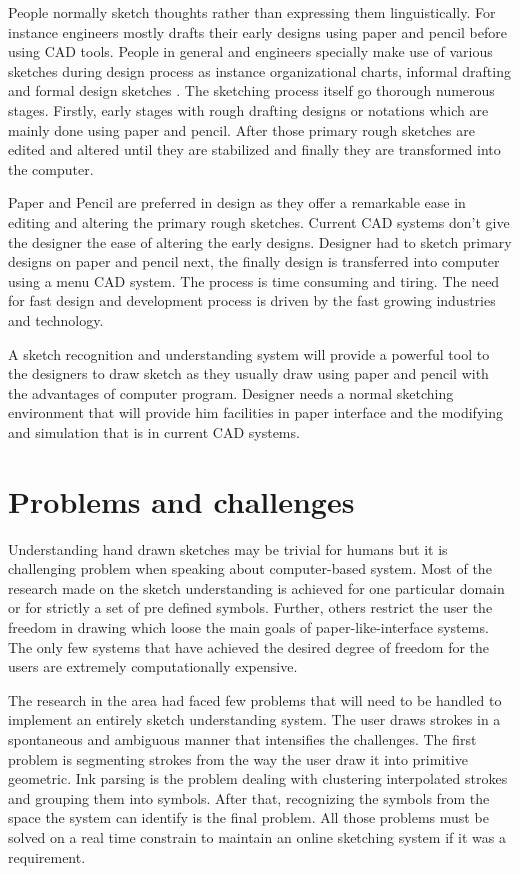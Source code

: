 People normally sketch thoughts rather than expressing them linguistically. For instance engineers mostly drafts their early designs using paper and pencil before using CAD tools.  People in general and engineers specially make use of various sketches during design process as instance organizational charts, informal drafting and formal design sketches \cite{}. The sketching process itself go thorough numerous stages. Firstly, early stages with rough drafting designs or notations which are mainly done using paper and pencil. After those primary rough sketches are edited and altered until they are stabilized and finally they are transformed into the computer.


 Paper and Pencil are preferred in design as they offer a remarkable ease in editing and altering the primary rough sketches. Current CAD systems don't give the designer the ease of altering the early designs. Designer had to sketch primary designs on paper and pencil next, the finally design is transferred into computer using a menu CAD system. The process is time consuming and tiring. The need for fast design and development process is driven by the fast growing industries and technology.
 
 A sketch recognition and understanding system will provide a powerful tool to the designers to draw sketch as they usually draw using paper and pencil with the advantages of computer program. Designer needs a normal sketching environment that will provide him facilities in paper interface and the modifying and simulation that is in current CAD systems. 
 
\section{Problems and challenges}
\label{sec:ProblemsAndChallenges}

 Understanding hand drawn sketches may be trivial for humans but it is challenging problem when speaking about computer-based system. Most of the research made on the sketch understanding is achieved for one particular domain or for strictly a set of pre defined symbols. Further, others restrict the user the freedom in drawing which loose the main goals of paper-like-interface systems.  The only few systems that have achieved the desired degree of freedom for the users are extremely computationally expensive.   

The research in the area had faced few problems that will need to be handled to implement an entirely sketch understanding system. The user draws strokes in a spontaneous and ambiguous manner that intensifies the challenges. The first problem is segmenting strokes from the way the user draw it into primitive geometric. Ink parsing is the problem dealing with clustering interpolated strokes and grouping them into symbols. After that, recognizing the symbols from the space the system can identify is the final problem. All those problems must be solved on a real time constrain to maintain an online sketching system if it was a requirement.

